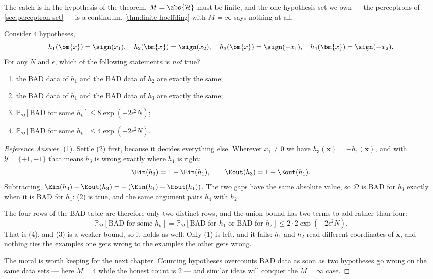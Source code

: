 The catch is in the hypothesis of the theorem. \(M = \abs{\mathcal{H}}\) must be
finite, and the one hypothesis set we own --- the perceptrons of
\autoref{sec:perceptron-set} --- is a continuum. \autoref{thm:finite-hoeffding}
with \(M = \infty\) says nothing at all.

\begin{exercise}
    Consider \(4\) hypotheses,
    \[
        h_1(\bm{x}) = \sign(x_1), \quad h_2(\bm{x}) = \sign(x_2), \quad
        h_3(\bm{x}) = \sign(-x_1), \quad h_4(\bm{x}) = \sign(-x_2).
    \]
    For any \(N\) and \(\epsilon\), which of the following statements is
    \emph{not} true?
    \begin{enumerate}[(1)]
        \item the BAD data of \(h_1\) and the BAD data of \(h_2\) are exactly
            the same;
        \item the BAD data of \(h_1\) and the BAD data of \(h_3\) are exactly
            the same;
        \item \(\mathbb{P}_{\mathcal{D}}\left[ \text{BAD for some } h_k \right]
            \le 8 \exp \left( -2 \epsilon^2 N \right)\);
        \item \(\mathbb{P}_{\mathcal{D}}\left[ \text{BAD for some } h_k \right]
            \le 4 \exp \left( -2 \epsilon^2 N \right)\).
    \end{enumerate}
\end{exercise}

\begin{proof}[Reference Answer]
    (1). Settle (2) first, because it decides everything else. Wherever
    \(x_1 \neq 0\) we have \(h_3(\bm{x}) = -h_1(\bm{x})\), and with
    \(\mathcal{Y} = \{+1, -1\}\) that means \(h_3\) is wrong exactly where
    \(h_1\) is right:
    \[
        \Ein(h_3) = 1 - \Ein(h_1), \qquad \Eout(h_3) = 1 - \Eout(h_1) .
    \]
    Subtracting, \(\Ein(h_3) - \Eout(h_3) = -\left( \Ein(h_1) - \Eout(h_1)
    \right)\). The two gaps have the same absolute value, so \(\mathcal{D}\) is
    BAD for \(h_3\) exactly when it is BAD for \(h_1\): (2) is true, and the
    same argument pairs \(h_4\) with \(h_2\).

    The four rows of the BAD table are therefore only two distinct rows, and the
    union bound has two terms to add rather than four:
    \[
        \mathbb{P}_{\mathcal{D}}\left[ \text{BAD for some } h_k \right]
        = \mathbb{P}_{\mathcal{D}}\left[ \text{BAD for } h_1 \text{ or BAD
        for } h_2 \right]
        \le 2 \cdot 2 \exp \left( -2 \epsilon^2 N \right) .
    \]
    That is (4), and (3) is a weaker bound, so it holds as well. Only (1) is
    left, and it fails: \(h_1\) and \(h_2\) read different coordinates of
    \(\bm{x}\), and nothing ties the examples one gets wrong to the examples
    the other gets wrong.

    The moral is worth keeping for the next chapter. Counting hypotheses
    overcounts BAD data as soon as two hypotheses go wrong on the same data
    sets --- here \(M = 4\) while the honest count is \(2\) --- and similar
    ideas will conquer the \(M = \infty\) case.
\end{proof}

